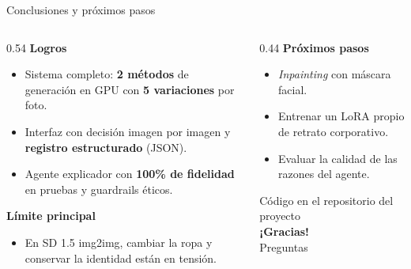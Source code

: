 \documentclass[aspectratio=169,11pt]{beamer}
\begin{document}
\begin{frame}{Conclusiones y próximos pasos}
  \begin{columns}[T]
    \begin{column}{0.54\textwidth}
      \textbf{Logros}
      \begin{itemize}
        \item Sistema completo: \textbf{2 métodos} de generación en GPU con \textbf{5 variaciones} por foto.
        \item Interfaz con decisión imagen por imagen y \textbf{registro estructurado} (JSON).
        \item Agente explicador con \textbf{100\% de fidelidad} en pruebas y guardrails éticos.
      \end{itemize}
      \vspace{0.25em}
      \textbf{Límite principal}
      \begin{itemize}
        \item En SD 1.5 img2img, cambiar la ropa y conservar la identidad están en tensión.
      \end{itemize}
    \end{column}
    \begin{column}{0.44\textwidth}
      \textbf{Próximos pasos}
      \begin{itemize}
        \item \emph{Inpainting} con máscara facial.
        \item Entrenar un LoRA propio de retrato corporativo.
        \item Evaluar la calidad de las razones del agente.
      \end{itemize}
      \vspace{0.6em}
      \begin{block}{}
        \centering
        Código en el repositorio del proyecto\\[0.4em]
        \Large \textbf{¡Gracias!}\\[0.2em]
        \normalsize Preguntas
      \end{block}
    \end{column}
  \end{columns}
\end{frame}
\end{document}
